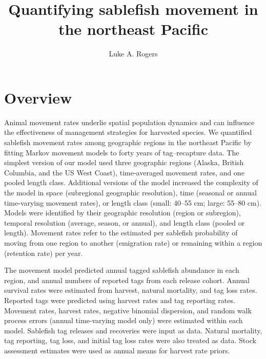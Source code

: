 \documentclass{article}
\title{Quantifying sablefish movement in the northeast Pacific}
\author[1]{Luke A. Rogers}
\affil[1]{Pacific Biological Station, Fisheries and Oceans Canada, Nanaimo, BC, V9T 6N7, Canada}
\begin{document}
\maketitle
\linenumbers
\setcounter{secnumdepth}{0} %


\section{Overview}
Animal movement rates underlie spatial population dynamics and can influence the effectiveness of management strategies for harvested species. We quantified sablefish movement rates among geographic regions in the northeast Pacific by fitting Markov movement models to forty years of tag--recapture data. The simplest version of our model used three geographic regions (Alaska, British Columbia, and the US West Coast), time-averaged movement rates, and one pooled length class. Additional versions of the model increased the complexity of the model in space (subregional geographic resolution), time (seasonal or annual time-varying movement rates), or length class (small: 40--55 cm; large: 55--80 cm). Models were identified by their geographic resolution (region or subregion), temporal resolution (average, season, or annual), and length class (pooled or length). Movement rates refer to the estimated per sablefish probability of moving from one region to another (emigration rate) or remaining within a region (retention rate) per year.

The movement model predicted annual tagged sablefish abundance in each region, and annual numbers of reported tags from each release cohort. Annual survival rates were estimated from harvest, natural mortality, and tag loss rates. Reported tags were predicted using harvest rates and tag reporting rates. Movement rates, harvest rates, negative binomial dispersion, and random walk process errors (annual time-varying model only) were estimated within each model. Sablefish tag releases and recoveries were input as data. Natural mortality, tag reporting, tag loss, and initial tag loss rates were also treated as data. Stock assessment estimates were used as annual means for harvest rate priors.
\end{document}
